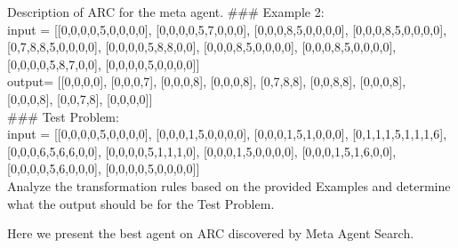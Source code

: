 \documentclass{article} %
\newcommand{\ouralgo}{Meta Agent Search\xspace}
\begin{document}
\begin{mybox}{Description of ARC for the meta agent.}
\#\#\# Example 2:\\
input = [[0,0,0,0,5,0,0,0,0], [0,0,0,0,5,7,0,0,0], [0,0,0,8,5,0,0,0,0], [0,0,0,8,5,0,0,0,0], [0,7,8,8,5,0,0,0,0], [0,0,0,0,5,8,8,0,0], [0,0,0,8,5,0,0,0,0], [0,0,0,8,5,0,0,0,0], [0,0,0,0,5,8,7,0,0], [0,0,0,0,5,0,0,0,0]]\\
output= [[0,0,0,0], [0,0,0,7], [0,0,0,8], [0,0,0,8], [0,7,8,8], [0,0,8,8], [0,0,0,8], [0,0,0,8], [0,0,7,8], [0,0,0,0]]\\

\#\#\# Test Problem:\\
input = [[0,0,0,0,5,0,0,0,0], [0,0,0,1,5,0,0,0,0], [0,0,0,1,5,1,0,0,0], [0,1,1,1,5,1,1,1,6], [0,0,0,6,5,6,6,0,0], [0,0,0,0,5,1,1,1,0], [0,0,0,1,5,0,0,0,0], [0,0,0,1,5,1,6,0,0], [0,0,0,0,5,6,0,0,0], [0,0,0,0,5,0,0,0,0]]\\

Analyze the transformation rules based on the provided Examples and determine what the output should be for the Test Problem.\\
\end{mybox}

Here we present the best agent on ARC discovered by \ouralgo.
\end{document}
